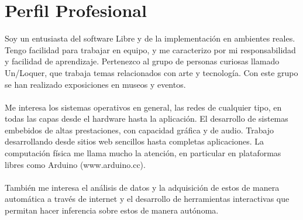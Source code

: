 \documentclass[a4paper, oneside, final, letter]{scrartcl}
\begin{document}
\section{Perfil Profesional}
Soy un entusiasta del software Libre y de la implementaci\'on en ambientes reales. Tengo facilidad para trabajar en equipo, y me caracterizo por mi responsabilidad y facilidad de aprendizaje. Pertenezco al grupo de personas curiosas llamado Un/Loquer, que trabaja temas relacionados con arte y tecnolog\'ia.
Con este grupo se han realizado exposiciones en museos y eventos.\\
\\
Me interesa los sistemas operativos en general, las redes de cualquier tipo, en todas las capas desde el hardware hasta la aplicaci\'on. El desarrollo de sistemas embebidos de altas prestaciones, con capacidad gr\'afica y de audio. Trabajo desarrollando desde sitios web sencillos hasta completas aplicaciones.
La computaci\'on f\'isica me llama mucho la atenci\'on, en particular en plataformas libres como Arduino (www.arduino.cc).\\
\\
Tambi\'en me interesa el an\'alisis de datos y la adquisici\'on de estos de manera autom\'atica a trav\'es de internet y el desarrollo de herramientas interactivas que permitan hacer inferencia sobre estos de manera aut\'onoma.
\end{document}
